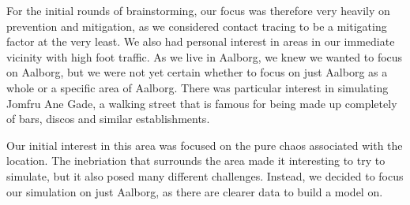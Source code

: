For the initial rounds of brainstorming, our focus was therefore very heavily on prevention and mitigation, as we considered contact tracing to be a mitigating factor at the very least. We also had personal interest in areas in our immediate vicinity with high foot traffic. As we live in Aalborg, we knew we wanted to focus on Aalborg, but we were not yet certain whether to focus on just Aalborg as a whole or a specific area of Aalborg. There was particular interest in simulating Jomfru Ane Gade, a walking street that is famous for being made up completely of bars, discos and similar establishments.

Our initial interest in this area was focused on the pure chaos associated with the location. The inebriation that surrounds the area made it interesting to try to simulate, but it also posed many different challenges. Instead, we decided to focus our simulation on just Aalborg, as there are clearer data to build a model on.


